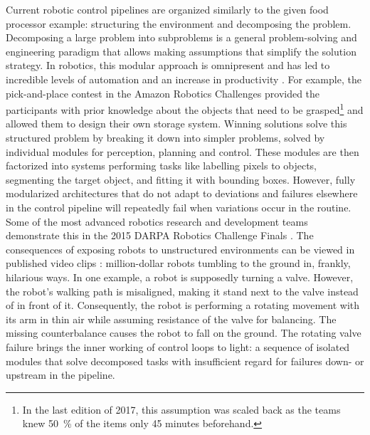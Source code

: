 \documentclass[\home/main.tex]{subfiles}
\begin{document}
Current robotic control pipelines are organized similarly to the given food processor example: structuring the environment and decomposing the problem. Decomposing a large problem into subproblems is a general problem-solving and engineering paradigm that allows making assumptions that simplify the solution strategy.
In robotics, this modular approach is omnipresent and has led to incredible levels of automation and an increase in productivity \autocite{Graetz2018}. For example, the pick-and-place contest in the Amazon Robotics Challenges provided the participants with prior knowledge about the objects that need to be grasped\footnote{In the last edition of 2017, this assumption was scaled back as the teams knew \qty{50}{\percent} of the items only 45 minutes beforehand.} and allowed them to design their own storage system. Winning solutions \autocite{ijcai2017,morrison2018cartman} solve this structured problem by breaking it down into simpler problems, solved by individual modules for perception, planning and control. These modules are then factorized into systems performing tasks like labelling pixels to objects, segmenting the target object, and fitting it with bounding boxes.
However, fully modularized architectures that do not adapt to deviations and failures elsewhere in the control pipeline will repeatedly fail when variations occur in the routine. Some of the most advanced robotics research and development teams demonstrate this in the 2015 DARPA Robotics Challenge Finals \autocite{DARPA2015}. The consequences of exposing robots to unstructured environments can be viewed in published video clips \autocite{darpaVideos}: million-dollar robots tumbling to the ground in, frankly, hilarious ways. In one example, a robot is supposedly turning a valve. However, the robot's walking path is misaligned, making it stand next to the valve instead of in front of it. Consequently, the robot is performing a rotating movement with its arm in thin air while assuming resistance of the valve for balancing. The missing counterbalance causes the robot to fall on the ground. The rotating valve failure brings the inner working of control loops to light: a sequence of isolated modules that solve decomposed tasks with insufficient regard for failures down- or upstream in the pipeline.
\end{document}
